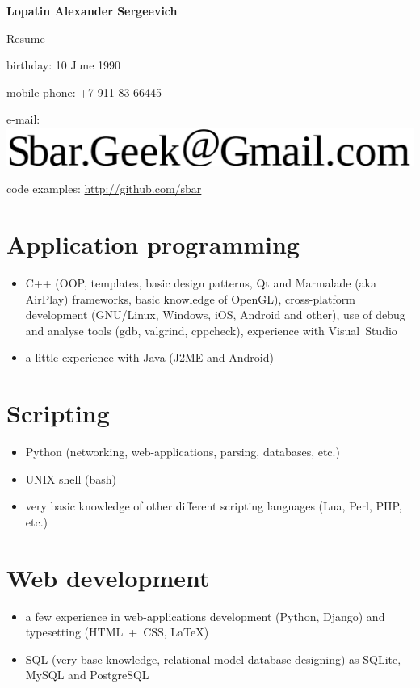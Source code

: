 \begin{center}
\fontsize{16pt}{14pt}\selectfont
\bfseries Lopatin Alexander Sergeevich\mdseries

\fontsize{14pt}{14pt}\selectfont
Resume
\end{center}

{
\fontsize{12pt}{12pt}\selectfont
\begin{flushright}
\item birthday: 10 June 1990
\item mobile phone: +7 911 83 66445
\item e-mail: \includegraphics[scale=0.2]{email}
\item code examples: \url{http://github.com/sbar}
\end{flushright}
}

\section{Application programming}
\begin{itemize}
\item C++ (OOP, templates, basic design patterns,
Qt and Marmalade (aka AirPlay) frameworks,
basic knowledge of OpenGL),
cross-platform development (GNU/Linux, Windows, iOS, Android and other),
use of debug and analyse tools (gdb, valgrind, cppcheck),
experience with Visual~Studio
\item a little experience with Java (J2ME and Android)
\end{itemize}

\section{Scripting}
\begin{itemize}
\item Python (networking, web-applications, parsing, databases, etc.)
\item UNIX shell (bash)
\item very basic knowledge of other different scripting languages
(Lua, Perl, PHP, etc.)
\end{itemize}

\section{Web development}
\begin{itemize}
\item a few experience in web-applications development (Python, Django)
and typesetting (HTML~+~CSS, LaTeX)
\item SQL (very base knowledge, relational model database designing)
as SQLite, MySQL and PostgreSQL
\end{itemize}

